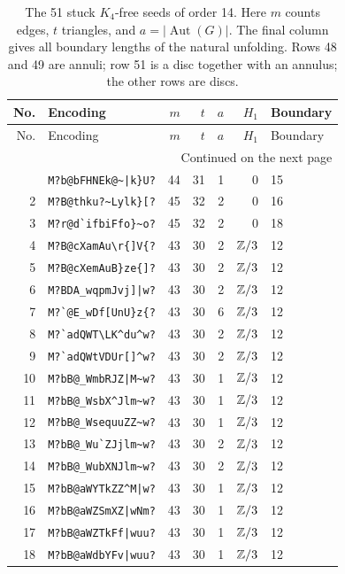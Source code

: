 \begingroup\small
\setlength{\tabcolsep}{3pt}
\begin{longtable}{rlrrrrl}
\caption{The 51 stuck $K_4$-free seeds of order 14. Here $m$ counts edges, $t$ triangles, and $a=|\operatorname{Aut}(G)|$. The final column gives all boundary lengths of the natural unfolding. Rows 48 and 49 are annuli; row 51 is a disc together with an annulus; the other rows are discs.}\label{tab:seeds}\\
\toprule
No. & Encoding & $m$ & $t$ & $a$ & $H_1$ & Boundary \\
\midrule\endfirsthead
\toprule
No. & Encoding & $m$ & $t$ & $a$ & $H_1$ & Boundary \\
\midrule\endhead
\midrule\multicolumn{7}{r}{Continued on the next page}\\
\endfoot\bottomrule\endlastfoot
1 & \verb+M?b@bFHNEk@~|k}U?+ & 44 & 31 & 1 & $0$ & 15 \\
2 & \verb+M?B@thku?~Lylk}[?+ & 45 & 32 & 2 & $0$ & 16 \\
3 & \verb+M?r@d`ifbiFfo}~o?+ & 45 & 32 & 2 & $0$ & 18 \\
4 & \verb+M?B@cXamAu\r{]V{?+ & 43 & 30 & 2 & $\mathbb Z/3$ & 12 \\
5 & \verb+M?B@cXemAuB}ze{]?+ & 43 & 30 & 2 & $\mathbb Z/3$ & 12 \\
6 & \verb+M?BDA_wqpmJvj]|w?+ & 43 & 30 & 2 & $\mathbb Z/3$ & 12 \\
7 & \verb+M?`@E_wDf[UnU}z{?+ & 43 & 30 & 6 & $\mathbb Z/3$ & 12 \\
8 & \verb+M?`adQWT\LK^du^w?+ & 43 & 30 & 2 & $\mathbb Z/3$ & 12 \\
9 & \verb+M?`adQWtVDUr[]^w?+ & 43 & 30 & 2 & $\mathbb Z/3$ & 12 \\
10 & \verb+M?bB@_WmbRJZ|M~w?+ & 43 & 30 & 1 & $\mathbb Z/3$ & 12 \\
11 & \verb+M?bB@_WsbX^Jlm~w?+ & 43 & 30 & 1 & $\mathbb Z/3$ & 12 \\
12 & \verb+M?bB@_WsequuZZ~w?+ & 43 & 30 & 1 & $\mathbb Z/3$ & 12 \\
13 & \verb+M?bB@_Wu`ZJjlm~w?+ & 43 & 30 & 2 & $\mathbb Z/3$ & 12 \\
14 & \verb+M?bB@_WubXNJlm~w?+ & 43 & 30 & 2 & $\mathbb Z/3$ & 12 \\
15 & \verb+M?bB@aWYTkZZ^M|w?+ & 43 & 30 & 1 & $\mathbb Z/3$ & 12 \\
16 & \verb+M?bB@aWZSmXZ|wNm?+ & 43 & 30 & 1 & $\mathbb Z/3$ & 12 \\
17 & \verb+M?bB@aWZTkFf|wuu?+ & 43 & 30 & 1 & $\mathbb Z/3$ & 12 \\
18 & \verb+M?bB@aWdbYFv|wuu?+ & 43 & 30 & 1 & $\mathbb Z/3$ & 12 \\

\end{longtable}
